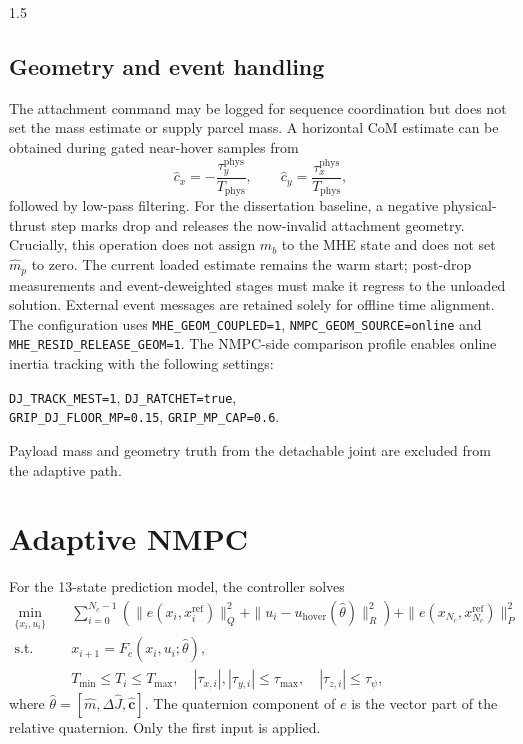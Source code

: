 \begin{spacing}{1.5}
\subsection{Geometry and event handling}

The attachment command may be logged for sequence coordination but does
not set the mass estimate or supply parcel mass. A horizontal CoM
estimate can be obtained during gated near-hover samples from
\begin{equation}
\hat c_x=-\frac{\tau_y^{\mathrm{phys}}}{T_{\mathrm{phys}}},
\qquad
\hat c_y=\frac{\tau_x^{\mathrm{phys}}}{T_{\mathrm{phys}}},
\end{equation}
followed by low-pass filtering. For the dissertation baseline, a negative
physical-thrust step marks drop and releases the now-invalid attachment
geometry. Crucially, this operation does not assign $m_b$ to the MHE
state and does not set $\hat m_p$ to zero. The current loaded estimate
remains the warm start; post-drop measurements and event-deweighted
stages must make it regress to the unloaded solution. External event
messages are retained solely for offline time alignment. The
configuration uses \texttt{MHE\_GEOM\_COUPLED=1},
\texttt{NMPC\_GEOM\_SOURCE=online} and
\texttt{MHE\_RESID\_RELEASE\_GEOM=1}. The NMPC-side comparison profile
enables online inertia tracking with the following settings:
\begin{center}
\small
\texttt{DJ\_TRACK\_MEST=1}, \texttt{DJ\_RATCHET=true},\\
\texttt{GRIP\_DJ\_FLOOR\_MP=0.15}, \texttt{GRIP\_MP\_CAP=0.6}.
\end{center}
Payload mass and geometry truth from the detachable joint are excluded
from the adaptive path.

\section{Adaptive NMPC}

For the 13-state prediction model, the controller solves
\begin{align}
\min_{\{x_i,u_i\}}\quad&
\sum_{i=0}^{N_c-1}\left(
\|e(x_i,x_i^{\mathrm{ref}})\|_Q^2+
\|u_i-u_{\mathrm{hover}}(\hat\theta)\|_R^2
\right)+
\|e(x_{N_c},x_{N_c}^{\mathrm{ref}})\|_P^2\\
\text{s.t.}\quad&
x_{i+1}=F_c(x_i,u_i;\hat\theta),\\
& T_{\min}\le T_i\le T_{\max},\quad
|\tau_{x,i}|,|\tau_{y,i}|\le\tau_{\max},\quad
|\tau_{z,i}|\le\tau_{\psi},
\label{eq:nmpc-framework}
\end{align}
where $\hat\theta=[\hat m,\Delta\hat J,\hat{\bm c}]$. The quaternion component of $e$ is the vector part of the relative quaternion. Only the first input is applied.


\end{spacing}

